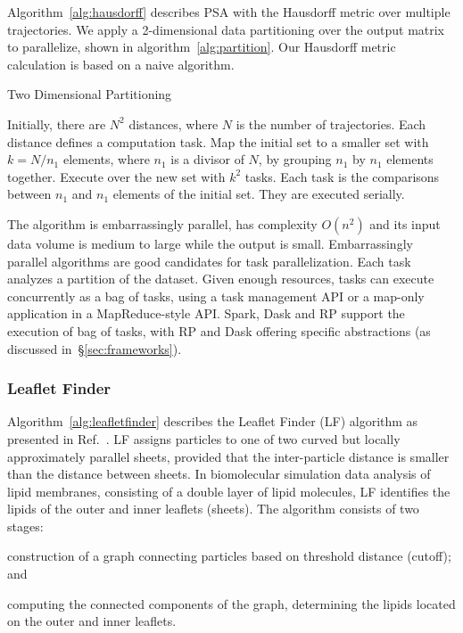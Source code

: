 Algorithm~\ref{alg:hausdorff} describes PSA with the Hausdorff metric over
multiple trajectories. We apply a 2-dimensional data partitioning over the
output matrix to parallelize, shown in algorithm~\ref{alg:partition}. Our
Hausdorff metric calculation is based on a naive algorithm.


\begin{algorithm}[t]
    \scriptsize
    \caption{Two Dimensional Partitioning}
    \label{alg:partition}
    \begin{algorithmic}[1]
        \State Initially, there are $N^2$ distances, where $N$ is the number of trajectories.
        Each distance defines a computation task.
        \State Map the initial set to a smaller set with $k=N/n_1$ elements, where $n_1$ is a divisor of $N$, by grouping $n_1$ by $n_1$ elements together.
        \State Execute over the new set with $k^2$ tasks.
        Each task is the comparisons between $n_1$ and $n_1$  elements of the initial set.
        They are executed serially.
    \end{algorithmic}
\end{algorithm}

The algorithm is embarrassingly parallel, has complexity $O(n^2)$ and its input
data volume is medium to large while the output is small.
Embarrassingly parallel algorithms are good candidates for task parallelization.
Each task analyzes a partition of the dataset. Given
enough resources, tasks can execute concurrently as a bag of tasks, using a task
management API or a map-only application in a MapReduce-style API. Spark, Dask
and RP support the execution of bag of tasks, with RP and
Dask offering specific abstractions (as discussed in~\S\ref{sec:frameworks}).

\subsubsection*{Leaflet Finder}

Algorithm~\ref{alg:leafletfinder} describes the Leaflet Finder (LF) algorithm as
presented in Ref.~\cite{michaud2011mdanalysis}. LF assigns particles to one of
two curved but locally approximately parallel sheets, provided that the
inter-particle distance is smaller than the distance between sheets. In
biomolecular simulation data analysis of lipid membranes, consisting of a double
layer of lipid molecules, LF identifies the lipids of the outer and inner
leaflets (sheets). The algorithm consists of two stages:
\begin{inparaenum}[a)]
    \item construction of a graph connecting particles based on threshold
    distance (cutoff); and
    \item computing the connected components of the graph, determining the
    lipids located on the outer and inner leaflets.
\end{inparaenum}


